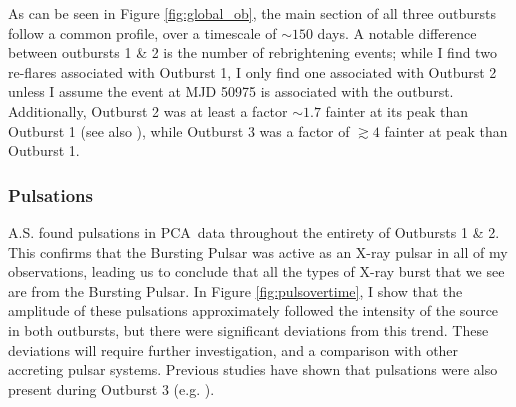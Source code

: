 \par As can be seen in Figure \ref{fig:global_ob}, the main section of all three outbursts follow a common profile, over a timescale of $\sim150$ days.  A notable difference between outbursts 1 \& 2 is the number of rebrightening events; while I find two re-flares associated with Outburst 1, I only find one associated with Outburst 2 unless I assume the event at MJD 50975 is associated with the outburst.  Additionally, Outburst 2 was at least a factor $\sim1.7$ fainter at its peak than Outburst 1 (see also \citealp{Woods_OB2}), while Outburst 3 was a factor of $\gtrsim4$ fainter at peak than Outburst 1.

\subsubsection{Pulsations}

\par \textsf{A.S.} found pulsations in PCA\indexpca\ data throughout the entirety of Outbursts 1 \& 2.  This confirms that the Bursting Pulsar was active as an X-ray pulsar in all of my observations, leading us to conclude that all the types of X-ray burst that we see are from the Bursting Pulsar.  In Figure \ref{fig:pulsovertime}, I show that the amplitude of these pulsations approximately followed the intensity of the source in both outbursts, but there were significant deviations from this trend.  These deviations will require further investigation, and a comparison with other accreting pulsar systems.  Previous studies have shown that pulsations were also present during Outburst 3 (e.g. \citealp{Sanna_BP}).

